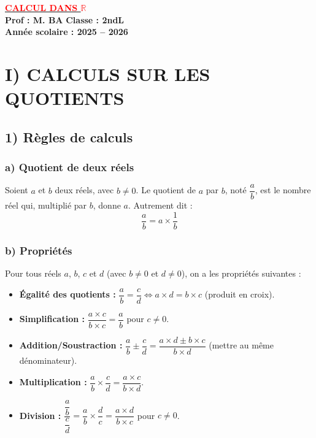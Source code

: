 \documentclass[12pt,a4paper]{article}
\begin{document}
\begin{center}
\Large\textbf{\underline{\textcolor{red}{CALCUL DANS $\mathbb{R}$}}}\\[-0.1cm]
    \normalsize\textbf{Prof : M. BA} \hfill \textbf{Classe : 2ndL}\\[-0.1cm]
    \textbf{Année scolaire : 2025 -- 2026}
\end{center}

\section*{\color{myred} I) CALCULS SUR LES QUOTIENTS}

\subsection*{\color{myred} 1) Règles de calculs}

\subsubsection*{\color{myred} a) Quotient de deux réels}
Soient $a$ et $b$ deux réels, avec $b \neq 0$. Le quotient de $a$ par $b$, noté $\dfrac{a}{b}$, est le nombre réel qui, multiplié par $b$, donne $a$. Autrement dit :
\[
\dfrac{a}{b} = a \times \dfrac{1}{b}
\]

\subsubsection*{\color{myred} b) Propriétés}
Pour tous réels $a$, $b$, $c$ et $d$ (avec $b \neq 0$ et $d \neq 0$), on a les propriétés suivantes :
\begin{itemize}
    \item \textbf{Égalité des quotients :} $\dfrac{a}{b} = \dfrac{c}{d} \iff a \times d = b \times c$ (produit en croix).
    \item \textbf{Simplification :} $\dfrac{a \times c}{b \times c} = \dfrac{a}{b}$ pour $c \neq 0$.
    \item \textbf{Addition/Soustraction :} $\dfrac{a}{b} \pm \dfrac{c}{d} = \dfrac{a \times d \pm b \times c}{b \times d}$ (mettre au même dénominateur).
    \item \textbf{Multiplication :} $\dfrac{a}{b} \times \dfrac{c}{d} = \dfrac{a \times c}{b \times d}$.
    \item \textbf{Division :} $\dfrac{\dfrac{a}{b}}{\dfrac{c}{d}} = \dfrac{a}{b} \times \dfrac{d}{c} = \dfrac{a \times d}{b \times c}$ pour $c \neq 0$.
\end{itemize}
\end{document}
